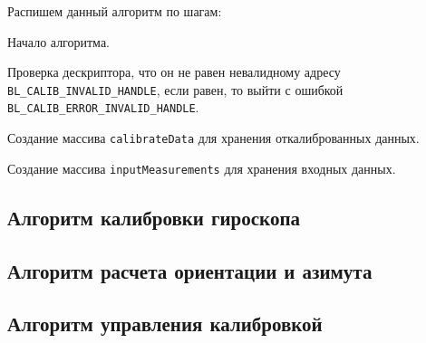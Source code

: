 Распишем данный алгоритм по шагам:
\begin{enumerate_step}
    \item Начало алгоритма.
    \item Проверка дескриптора, что он не равен невалидному адресу \lstinline|BL_CALIB_INVALID_HANDLE|, если равен, то выйти с ошибкой
    \lstinline|BL_CALIB_ERROR_INVALID_HANDLE|.
    \item Создание массива \lstinline|calibrateData| для хранения откалиброванных данных.
    \item Создание массива \lstinline|inputMeasurements| для хранения входных данных.
    \item 
\end{enumerate_step}


\subsection{Алгоритм калибровки гироскопа}

\subsection{Алгоритм расчета ориентации и азимута}

\subsection{Алгоритм управления калибровкой}
